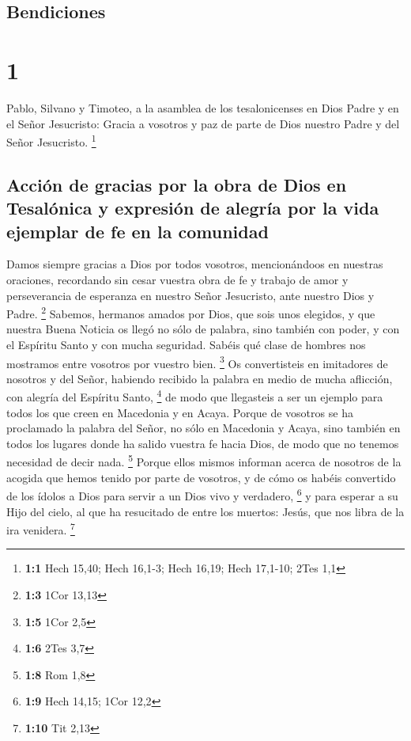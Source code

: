 \hypertarget{bendiciones}{%
\subsection{Bendiciones}\label{bendiciones}}

\hypertarget{section}{%
\section{1}\label{section}}

 Pablo, Silvano y Timoteo, a la asamblea de los
tesalonicenses en Dios Padre y en el Señor Jesucristo: Gracia a vosotros
y paz de parte de Dios nuestro Padre y del Señor Jesucristo. \footnote{\textbf{1:1}
  Hech 15,40; Hech 16,1-3; Hech 16,19; Hech 17,1-10; 2Tes 1,1}

\hypertarget{acciuxf3n-de-gracias-por-la-obra-de-dios-en-tesaluxf3nica-y-expresiuxf3n-de-alegruxeda-por-la-vida-ejemplar-de-fe-en-la-comunidad}{%
\subsection{Acción de gracias por la obra de Dios en Tesalónica y
expresión de alegría por la vida ejemplar de fe en la
comunidad}\label{acciuxf3n-de-gracias-por-la-obra-de-dios-en-tesaluxf3nica-y-expresiuxf3n-de-alegruxeda-por-la-vida-ejemplar-de-fe-en-la-comunidad}}

 Damos siempre gracias a Dios por todos vosotros,
mencionándoos en nuestras oraciones,  recordando sin cesar
vuestra obra de fe y trabajo de amor y perseverancia de esperanza en
nuestro Señor Jesucristo, ante nuestro Dios y Padre. \footnote{\textbf{1:3}
  1Cor 13,13}  Sabemos, hermanos amados por Dios, que sois
unos elegidos,  y que nuestra Buena Noticia os llegó no
sólo de palabra, sino también con poder, y con el Espíritu Santo y con
mucha seguridad. Sabéis qué clase de hombres nos mostramos entre
vosotros por vuestro bien. \footnote{\textbf{1:5} 1Cor 2,5}
 Os convertisteis en imitadores de nosotros y del Señor,
habiendo recibido la palabra en medio de mucha aflicción, con alegría
del Espíritu Santo, \footnote{\textbf{1:6} 2Tes 3,7}  de
modo que llegasteis a ser un ejemplo para todos los que creen en
Macedonia y en Acaya.  Porque de vosotros se ha proclamado
la palabra del Señor, no sólo en Macedonia y Acaya, sino también en
todos los lugares donde ha salido vuestra fe hacia Dios, de modo que no
tenemos necesidad de decir nada. \footnote{\textbf{1:8} Rom 1,8}
 Porque ellos mismos informan acerca de nosotros de la
acogida que hemos tenido por parte de vosotros, y de cómo os habéis
convertido de los ídolos a Dios para servir a un Dios vivo y verdadero,
\footnote{\textbf{1:9} Hech 14,15; 1Cor 12,2}  y para
esperar a su Hijo del cielo, al que ha resucitado de entre los muertos:
Jesús, que nos libra de la ira venidera. \footnote{\textbf{1:10} Tit
  2,13}

